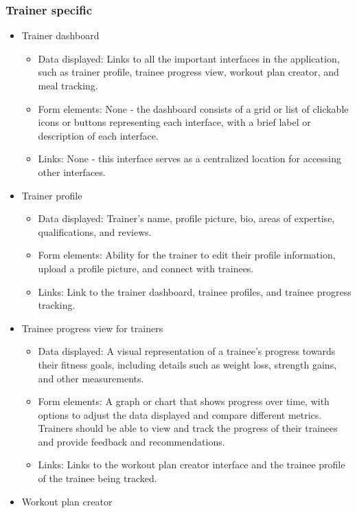 \documentclass{article}
\begin{document}
\subsubsection*{Trainer specific}
\begin{itemize}
\item Trainer dashboard
    \begin{itemize}
        \item Data displayed: Links to all the important interfaces in the application, such as trainer profile, trainee progress view, workout plan creator, and meal tracking.
        \item Form elements: None - the dashboard consists of a grid or list of clickable icons or buttons representing each interface, with a brief label or description of each interface.
        \item Links: None - this interface serves as a centralized location for accessing other interfaces.
    \end{itemize}
\item Trainer profile
    \begin{itemize}
        \item Data displayed: Trainer's name, profile picture, bio, areas of expertise, qualifications, and reviews.
        \item Form elements: Ability for the trainer to edit their profile information, upload a profile picture, and connect with trainees.
        \item Links: Link to the trainer dashboard, trainee profiles, and trainee progress tracking.
    \end{itemize}
\item Trainee progress view for trainers
    \begin{itemize}
        \item Data displayed: A visual representation of a trainee's progress towards their fitness goals, including details such as weight loss, strength gains, and other measurements.
        \item Form elements: A graph or chart that shows progress over time, with options to adjust the data displayed and compare different metrics. Trainers should be able to view and track the progress of their trainees and provide feedback and recommendations.
        \item Links: Links to the workout plan creator interface and the trainee profile of the trainee being tracked.
    \end{itemize}
\item Workout plan creator

\end{itemize}
\end{document}
